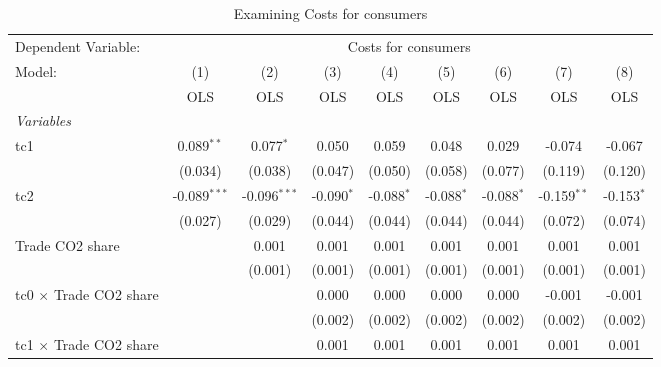 
\begin{table}[htbp]
   \caption{Examining Costs for consumers}
   \centering
   \begin{tabular}{lcccccccc}
      \toprule
      Dependent Variable: & \multicolumn{8}{c}{Costs for consumers}\\
      Model:                                  & (1)            & (2)            & (3)          & (4)          & (5)          & (6)          & (7)           & (8)\\  
                                              &  OLS           & OLS            & OLS          & OLS          & OLS          & OLS          & OLS           & OLS\\  
      \midrule
      \emph{Variables}\\
      tc1                                     & 0.089$^{**}$   & 0.077$^{*}$    & 0.050        & 0.059        & 0.048        & 0.029        & -0.074        & -0.067\\   
                                              & (0.034)        & (0.038)        & (0.047)      & (0.050)      & (0.058)      & (0.077)      & (0.119)       & (0.120)\\   
      tc2                                     & -0.089$^{***}$ & -0.096$^{***}$ & -0.090$^{*}$ & -0.088$^{*}$ & -0.088$^{*}$ & -0.088$^{*}$ & -0.159$^{**}$ & -0.153$^{*}$\\   
                                              & (0.027)        & (0.029)        & (0.044)      & (0.044)      & (0.044)      & (0.044)      & (0.072)       & (0.074)\\   
      Trade CO2 share                         &                & 0.001          & 0.001        & 0.001        & 0.001        & 0.001        & 0.001         & 0.001\\   
                                              &                & (0.001)        & (0.001)      & (0.001)      & (0.001)      & (0.001)      & (0.001)       & (0.001)\\   
      tc0 $\times$ Trade CO2 share            &                &                & 0.000        & 0.000        & 0.000        & 0.000        & -0.001        & -0.001\\   
                                              &                &                & (0.002)      & (0.002)      & (0.002)      & (0.002)      & (0.002)       & (0.002)\\   
      tc1 $\times$ Trade CO2 share            &                &                & 0.001        & 0.001        & 0.001        & 0.001        & 0.001         & 0.001\\   

\end{tabular}
\end{table}
